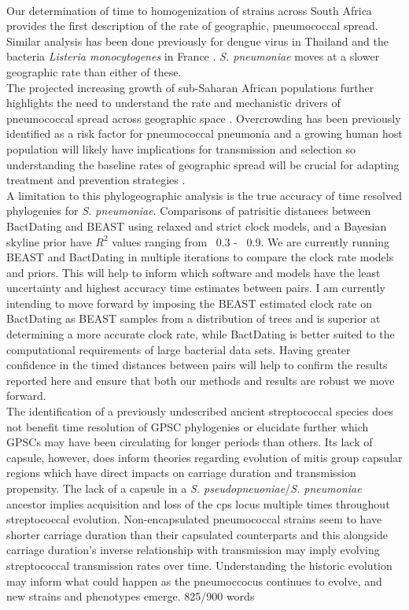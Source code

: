 \documentclass{article}
\begin{document}
 \\Our determination of time to homogenization of strains across South Africa provides the first description of the rate of geographic, pneumococcal spread. Similar analysis has been done previously for dengue virus in Thailand \cite{saljeDengueDiversitySpatial2017} and the bacteria \textit{Listeria monocytogenes} in France \cite{mouraEmergenceGlobalSpread2020}. \textit{S. pneumoniae} moves at a slower geographic rate than either of these. 
\\The projected increasing growth of sub-Saharan African populations further highlights the need to understand the rate and mechanistic drivers of pneumococcal spread across geographic space \cite{abubakarFutureMigrationHuman2020a}. Overcrowding has been previously identified as a risk factor for pneumococcal pneumonia and a growing human host population will likely have implications for transmission and selection so understanding the baseline rates of geographic spread will be crucial for adapting treatment and prevention strategies \cite{veraniRiskFactorsPresumed2016}. 
 \\A limitation to this phylogeographic analysis is the true accuracy of time resolved phylogenies for \textit{S. pneumoniae}. Comparisons of patrisitic distances between BactDating and BEAST using relaxed and strict clock models, and a Bayesian skyline prior have $R^2$ values ranging from ~0.3 - ~0.9.  We are currently running BEAST and BactDating in multiple iterations to compare the clock rate models and priors. This will help to inform which software and models have the least uncertainty and highest accuracy time estimates between pairs. I am currently intending to move forward by imposing the BEAST estimated clock rate on BactDating as BEAST samples from a distribution of trees and is superior at determining a more accurate clock rate, while BactDating is better suited to the computational requirements of large bacterial data sets. Having greater confidence in the timed distances between pairs will help to confirm the results reported here and ensure that both our methods and results are robust we move forward. 
\\The identification of a previously undescribed ancient streptococcal species does not benefit time resolution of GPSC phylogenies or elucidate further which GPSCs may have been circulating for longer periods than others. Its lack of capsule, however, does inform theories regarding evolution of mitis group capsular regions which have direct impacts on carriage duration and transmission propensity. The lack of a capsule in a \textit{S. pseudopneuoniae}/\textit{S. pneumoniae} ancestor implies acquisition and loss of the cps locus multiple times throughout streptococcal evolution. Non-encapsulated pneumococcal strains seem to have shorter carriage duration than their capsulated counterparts and this alongside carriage duration's inverse relationship with transmission may imply evolving streptococcal transmission rates over time\cite{bradshawSelectivePressureRise2019
bradshawTransformationNonencapsulatedStreptococcus2020}. Understanding the historic evolution may inform what could happen as the pneumoccocus continues to evolve, and new strains and phenotypes emerge.
825/900 words
\end{document}
